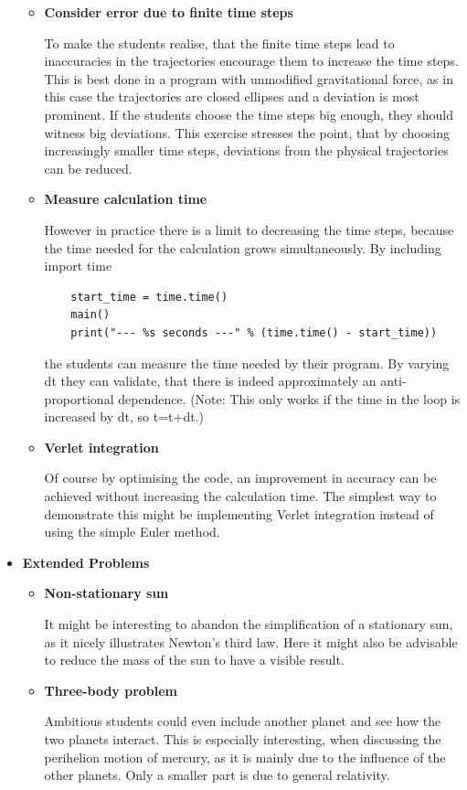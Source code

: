 \documentclass[12pt]{iopart}
\begin{document}
\begin{itemize}
\begin{itemize}
\item \textbf{Consider error due to finite time steps}

To make the students realise, that the finite time steps lead to inaccuracies in the trajectories encourage them to increase the time steps. This is best done in a program with unmodified gravitational force, as in this case the trajectories are closed ellipses and a deviation is most prominent. If the students choose the time steps big enough, they should witness big deviations. This exercise stresses the point, that by choosing increasingly smaller time steps, deviations from the physical trajectories can be reduced.
\item \textbf{Measure calculation time}

However in practice there is a limit to decreasing the time steps, because the time needed for the calculation grows simultaneously. By including
import time
\begin{lstlisting}
	start_time = time.time()
	main()
	print("--- %s seconds ---" % (time.time() - start_time))
\end{lstlisting}
the students can measure the time needed by their program. By varying dt they can validate, that there is indeed approximately an anti-proportional dependence. (Note: This only works if the time in the loop is increased by dt, so t=t+dt.)
\item \textbf{Verlet integration}

Of course by optimising the code, an improvement in accuracy can be achieved without increasing the calculation time. The simplest way to demonstrate this might be implementing Verlet integration instead of using the simple Euler method.
\end{itemize}

\item \textbf{Extended Problems}

\begin{itemize}
\item \textbf{Non-stationary sun}

It might be interesting to abandon the simplification of a stationary sun, as it nicely illustrates Newton's third law. Here it might also be advisable to reduce the mass of the sun to have a visible result.

\item \textbf{Three-body problem}

Ambitious students could even include another planet and see how the two planets interact. This is especially interesting, when discussing the perihelion motion of mercury, as it is mainly due to the influence of the other planets. Only a smaller part is due to general relativity.

\end{itemize}

\end{itemize}
\end{document}
